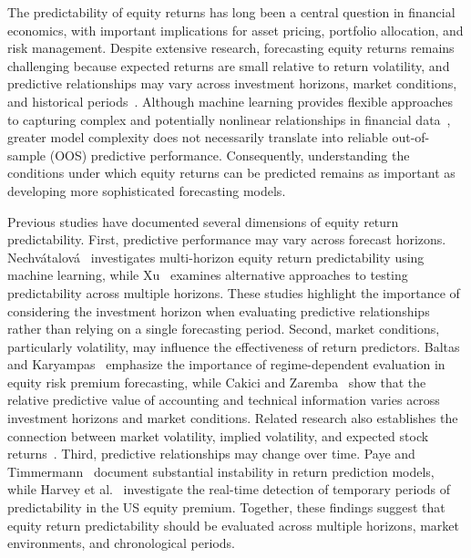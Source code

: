 \documentclass[12pt,twoside]{ord}
\begin{document}
The predictability of equity returns has long been a central question in financial economics, with important implications for asset pricing, portfolio allocation, and risk management. Despite extensive research, forecasting equity returns remains challenging because expected returns are small relative to return volatility, and predictive relationships may vary across investment horizons, market conditions, and historical periods~\cite{campbell1998,welch2008}. Although machine learning provides flexible approaches to capturing complex and potentially nonlinear relationships in financial data~\cite{gu2020}, greater model complexity does not necessarily translate into reliable out-of-sample (OOS) predictive performance. Consequently, understanding the conditions under which equity returns can be predicted remains as important as developing more sophisticated forecasting models.

Previous studies have documented several dimensions of equity return predictability. First, predictive performance may vary across forecast horizons. Nechv{\'a}talov{\'a}~\cite{nechvatalova2024} investigates multi-horizon equity return predictability using machine learning, while Xu~\cite{xu2020} examines alternative approaches to testing predictability across multiple horizons. These studies highlight the importance of considering the investment horizon when evaluating predictive relationships rather than relying on a single forecasting period. Second, market conditions, particularly volatility, may influence the effectiveness of return predictors. Baltas and Karyampas~\cite{baltas2018} emphasize the importance of regime-dependent evaluation in equity risk premium forecasting, while Cakici and Zaremba~\cite{cakici2025} show that the relative predictive value of accounting and technical information varies across investment horizons and market conditions. Related research also establishes the connection between market volatility, implied volatility, and expected stock returns~\cite{banerjee2007,bekaert2014,french1987}. Third, predictive relationships may change over time. Paye and Timmermann~\cite{paye2006} document substantial instability in return prediction models, while Harvey et al.~\cite{harvey2021} investigate the real-time detection of temporary periods of predictability in the US equity premium. Together, these findings suggest that equity return predictability should be evaluated across multiple horizons, market environments, and chronological periods.
\end{document}
